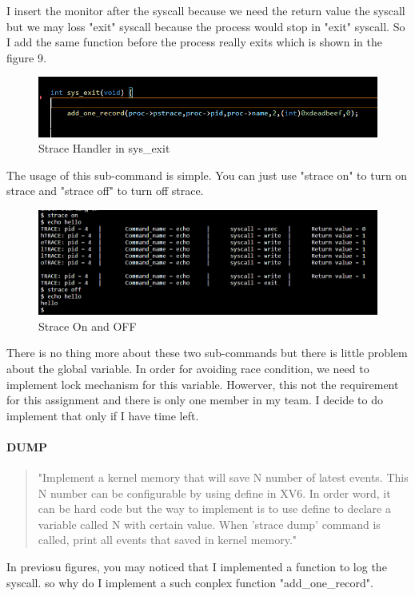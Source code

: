 \documentclass[11pt,oneside,a4paper]{article}
\begin{document}
I insert the monitor after the syscall because we need the return value the syscall
but we may loss "exit" syscall because the process would stop in "exit" syscall. 
So I add the same function before the process really exits which is shown in the figure 9.

\begin{figure}[H]
    \includegraphics[width=4.75in]{1-8.png}
    \centering
    \caption{Strace Handler in sys\_exit}
\end{figure}

The usage of this sub-command is simple. You can just use "strace on" to turn on
strace and "strace off" to turn off strace.

\begin{figure}[H]
    \includegraphics[width=4.75in]{1-13.png}
    \centering
    \caption{Strace On and OFF}
\end{figure}

There is no thing more about these 
two sub-commands but there is little problem about the global variable. In order for 
avoiding race condition, we need to implement lock mechanism for this variable. Howerver,
this not the requirement for this assignment and there is only one member in my team. 
I decide to do implement that only if I have time left.




\paragraph*{DUMP}
\begin{quotation}
"Implement a kernel memory that will save N number of latest events. This N number can be
configurable by using define in XV6. In order word, it can be hard code but the way to implement
is to use define to declare a variable called N with certain value. When 'strace dump' command is
called, print all events that saved in kernel memory."
\end{quotation}
In previosu figures, you may noticed that I implemented a function to log the syscall.
so why do I implement a such conplex function "add\_one\_record".
\end{document}
